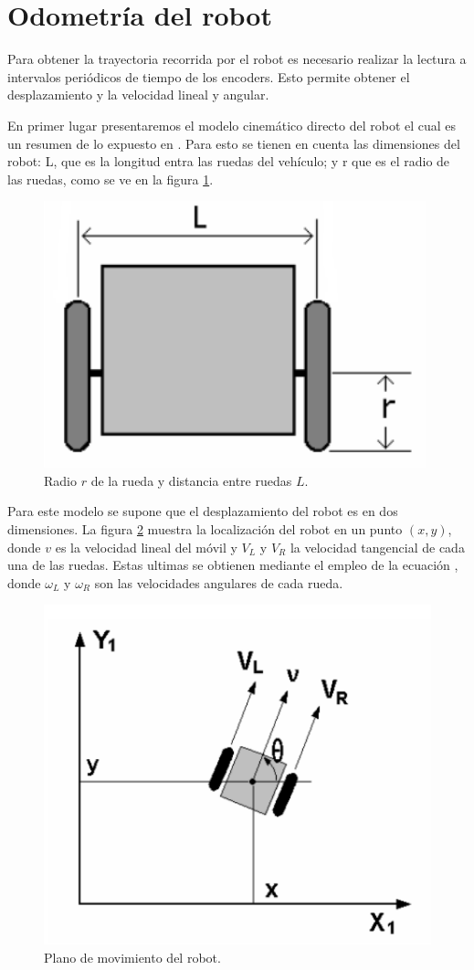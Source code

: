 \section{Odometría del robot}

Para obtener la trayectoria recorrida por el robot es necesario realizar la lectura a intervalos periódicos de tiempo de los encoders. Esto permite obtener el desplazamiento y la velocidad lineal y angular. 

En primer lugar presentaremos el modelo cinemático directo del robot el cual es un resumen de lo expuesto en \cite{cinematicaDirecta}. Para esto se tienen en cuenta las dimensiones del robot: L, que es la longitud entra las ruedas del vehículo; y r que es el radio de las ruedas, como se ve en la figura \ref{imagen:RobotRL}.





\begin{figure}[H]
	\centering
	\includegraphics[width=0.5\linewidth]{imagenes/prototipo/RobotRL}
	\caption{Radio $r$ de la rueda y distancia entre ruedas $L$.}
	\label{imagen:RobotRL}
\end{figure}

Para este modelo se supone que el desplazamiento del robot es en dos dimensiones. La figura \ref{imagen:RobotPlano} muestra la localización del robot en un punto $(x, y) $, donde $v$ es la velocidad lineal del móvil y ${ V }_{ L}$ y ${ V }_{ R}$ la velocidad tangencial de cada una de las ruedas. Estas ultimas se obtienen mediante el empleo de la ecuación , donde ${ \omega }_{ L}$ y ${ \omega}_{ R}$  son las velocidades angulares de cada rueda. 

\begin{figure}[H]
	\centering
	\includegraphics[width=0.5\linewidth]{imagenes/prototipo/RobotPlano}
	\caption{Plano de movimiento del robot.}
	\label{imagen:RobotPlano}
\end{figure}

